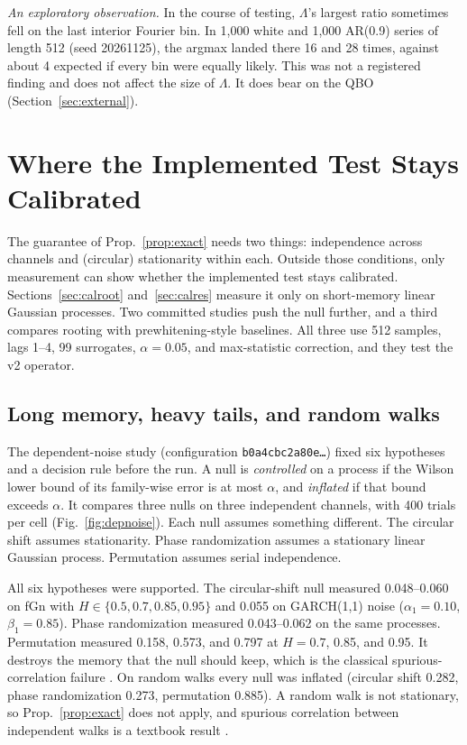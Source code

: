 \documentclass[10pt,twocolumn,letterpaper]{article}
\theoremstyle{definition}
\theoremstyle{remark}
\newcommand{\code}[1]{\texttt{#1}}
\begin{document}
\textit{An exploratory observation.} In the course of testing, $\Lambda$'s
largest ratio sometimes fell on the last interior Fourier bin. In 1{,}000 white
and 1{,}000 AR(0.9) series of length 512 (seed 20261125), the argmax landed there
16 and 28 times, against about 4 expected if every bin were equally likely. This
was not a registered finding and does not affect the size of $\Lambda$. It does
bear on the QBO (Section~\ref{sec:external}).

\section{Where the Implemented Test Stays Calibrated}\label{sec:nulls}

The guarantee of Prop.~\ref{prop:exact} needs two things: independence across
channels and (circular) stationarity within each. Outside those conditions,
only measurement can show whether the implemented test stays calibrated.
Sections~\ref{sec:calroot} and~\ref{sec:calres} measure it only on
short-memory linear Gaussian processes. Two
committed studies push the null further, and a third compares rooting with
prewhitening-style baselines. All three use 512 samples, lags 1--4, 99
surrogates, $\alpha=0.05$, and max-statistic correction, and they test the v2
operator.

\subsection{Long memory, heavy tails, and random walks}

The dependent-noise study (configuration \code{b0a4cbc2a80e\ldots}) fixed six
hypotheses and a decision rule before the run. A null is \emph{controlled} on a
process if the Wilson lower bound of its family-wise error is at most $\alpha$,
and \emph{inflated} if that bound exceeds $\alpha$. It compares three nulls on
three independent channels, with 400 trials per cell (Fig.~\ref{fig:depnoise}).
Each null assumes something different. The circular shift assumes
stationarity. Phase randomization assumes a stationary linear Gaussian process.
Permutation assumes serial independence.

All six hypotheses were supported. The circular-shift null measured
0.048--0.060 on fGn with $H\in\{0.5,0.7,0.85,0.95\}$ and 0.055 on GARCH(1,1)
noise ($\alpha_1=0.10$, $\beta_1=0.85$). Phase randomization measured
0.043--0.062 on the same processes. Permutation measured 0.158, 0.573, and 0.797
at $H=0.7$, 0.85, and 0.95. It destroys the memory that the null should keep,
which is the classical spurious-correlation failure \cite{bartlett}. On random
walks every null was inflated (circular shift 0.282, phase randomization 0.273,
permutation 0.885). A random walk is not stationary, so Prop.~\ref{prop:exact}
does not apply, and spurious correlation between independent walks is a
textbook result \cite{grangernewbold}.
\end{document}

